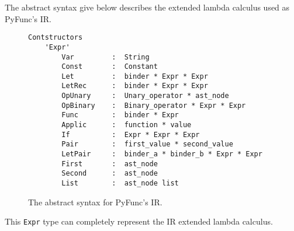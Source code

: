 \documentclass{l4proj}
\begin{document}
The abstract syntax give below describes the extended lambda calculus used as PyFunc's IR.
\begin{figure}[h!]
    \begin{center}
    \begin{small}
\begin{verbatim}
Contstructors
    'Expr'
        Var         :  String 
        Const       :  Constant
        Let         :  binder * Expr * Expr
        LetRec      :  binder * Expr * Expr
        OpUnary     :  Unary_operator * ast_node
        OpBinary    :  Binary_operator * Expr * Expr
        Func        :  binder * Expr
        Applic      :  function * value
        If          :  Expr * Expr * Expr
        Pair        :  first_value * second_value
        LetPair     :  binder_a * binder_b * Expr * Expr
        First       :  ast_node
        Second      :  ast_node
        List        :  ast_node list
\end{verbatim}
\end{small}
\caption{The abstract syntax for PyFunc's IR.}
\end{center}
\end{figure}


This \texttt{Expr} type can completely represent the IR extended lambda calculus. 
\end{document}
